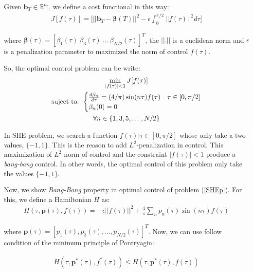 \begin{problem}\label{OCP1}
    Given  $\bm{b}_T  \in \mathbb{R}^{n_b}$, we define a cost functional in this way: 
        \begin{gather}
        J[f(\tau)] = \Bigg[ || \bm{b}_T - \bm{\beta}(T)||^2 - \epsilon \int_0^{\pi/2} ||f(\tau)||^2 d\tau \Bigg] 
    \end{gather}

    where $ \bm{\beta}(\tau) = [\beta_1(\tau) \ \beta_3(\tau)  \ ... \  \beta_{N/2}(\tau) ]^T$, the $||.||$ is a euclidean norm and $\epsilon$ is a penalization parameter to maximized the norm of control $f(\tau)$.
    \newline

    So, the optimal control problem can be write: 
    \begin{gather}
        \min_{|f(\tau) |<1} J[f(\tau)] \\
        \text{suject to: }
        \begin{cases}
            \frac{d\beta_n}{d\tau} = (4/\pi) \sin(n\tau) f(\tau) & \tau \in [0,\pi/2]\label{dyn}\\
            \beta_n(0) = 0
        \end{cases} \\
        \notag \forall n \in \{1,3,5,\dots,N/2 \}
    \end{gather}
\end{problem}

In SHE problem, we search a function $f(\tau) | \tau \in [0,\pi/2]$ whose only take a two values, $\{-1,1\}$. This is the reason to add $L^2$-penalization in control. This maximization of $L^2$-norm of control and the constraint $|f(\tau)|<1$ produce a \emph{bang-bang} control. In other words, the optimal control of this problem only take the values $\{-1,1\}$.

Now, we show \emph{Bang-Bang} property in optimal control of problem (\ref{SHEp}). For this, we define a Hamiltonian $H$ as:
\begin{gather}
    H(\tau,\bm{p}(\tau),f(\tau)) = -\epsilon || f(\tau)||^2 + \frac{4}{\pi}\sum_{n} p_n(\tau) \sin(n \tau) f(\tau)
\end{gather}

where $\bm{p}(\tau) = [p_1(\tau),p_3(\tau),\dots,p_{N/2}(\tau)]^T$. Now, we can use follow condition of the minimum principle of Pontryagin:

\begin{gather}\label{minH}
    H(\tau,\bm{p}^*(\tau),f^*(\tau)) \leq  H(\tau,\bm{p}^*(\tau),f(\tau))
\end{gather}

